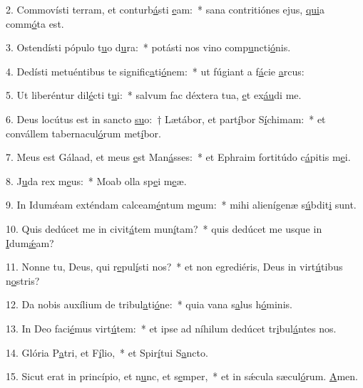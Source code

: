2. Commovísti terram, et conturb\uline{á}sti \uline{e}am:~* sana contritiónes ejus, \uline{qui}a comm\uline{ó}ta est.\par 
3. Ostendísti pópulo t\uline{u}o d\uline{u}ra:~* potásti nos vino comp\uline{u}ncti\uline{ó}nis.\par 
4. Dedísti metuéntibus te signific\uline{a}ti\uline{ó}nem:~* ut fúgiant a f\uline{á}cie \uline{a}rcus:\par 
5. Ut liberéntur dil\uline{é}cti t\uline{u}i:~* salvum fac déxtera tua, \uline{e}t ex\uline{áu}di me.\par 
6. Deus locútus est in sancto \uline{su}o:~† Lætábor, et part\uline{í}bor S\uline{í}chimam:~* et convállem tabernacul\uline{ó}rum met\uline{í}bor.\par 
7. Meus est Gálaad, et meus \uline{e}st Man\uline{á}sses:~* et Ephraim fortitúdo c\uline{á}pitis m\uline{e}i.\par 
8. J\uline{u}da rex m\uline{e}us:~* Moab olla sp\uline{e}i m\uline{e}æ.\par 
9. In Idumǽam exténdam calceam\uline{é}ntum m\uline{e}um:~* mihi alienígenæ s\uline{ú}bdit\uline{i} sunt.\par 
10. Quis dedúcet me in civit\uline{á}tem mun\uline{í}tam?~* quis dedúcet me usque in \uline{I}dum\uline{ǽ}am?\par 
11. Nonne tu, Deus, qui r\uline{e}pul\uline{í}sti nos?~* et non egrediéris, Deus in virt\uline{ú}tibus n\uline{o}stris?\par 
12. Da nobis auxílium de tribul\uline{a}ti\uline{ó}ne:~* quia vana s\uline{a}lus h\uline{ó}minis.\par 
13. In Deo faci\uline{é}mus virt\uline{ú}tem:~* et ipse ad níhilum dedúcet tr\uline{i}bul\uline{á}ntes nos.\par 
14. Glória P\uline{a}tri, et F\uline{í}lio,~* et Spir\uline{í}tui S\uline{a}ncto.\par 
15. Sicut erat in princípio, et n\uline{u}nc, et s\uline{e}mper,~* et in sǽcula sæcul\uline{ó}rum. \uline{A}men.\par 
